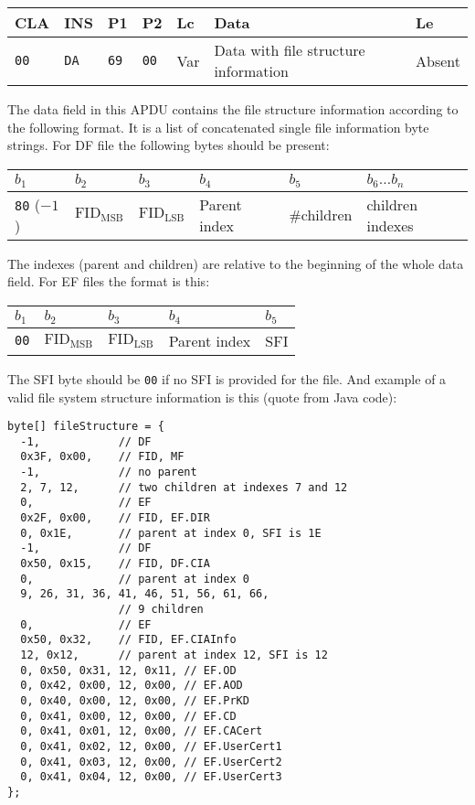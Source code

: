 \documentclass{article}
\begin{document}
\begin{flushleft}
\begin{tabular}{|l|l|l|l|l|l|l|}
\hline
CLA & INS & P1 & P2 & Lc & Data & Le \\
\hline
\texttt{00} & \texttt{DA} & \texttt{69} & \texttt{00} &
Var & Data with file structure information & Absent \\
\hline
\end{tabular}
\end{flushleft}
The data field in this APDU contains the file structure information
according to the following format. It is a list of concatenated single
file information byte strings.  For DF file the following bytes should
be present:
\begin{flushleft}
\begin{tabular}{|l|l|l|l|l|l|}
\hline
$b_1$ & $b_2$ & $b_3$ & $b_4$ & $b_5$ & $b_6\dots b_n$ \\
\hline
\texttt{80} ($-1$) & $\mathrm{FID}_{\mathrm{MSB}}$ & $\mathrm{FID}_{\mathrm{LSB}}$ & 
Parent index & \#children & children indexes\\
\hline
\end{tabular}
\end{flushleft}
The indexes (parent and children) are relative to the beginning of the
whole data field. For EF files the format is this:
\begin{flushleft}
\begin{tabular}{|l|l|l|l|l|}
\hline
$b_1$ & $b_2$ & $b_3$ & $b_4$ & $b_5$  \\
\hline
\texttt{00} & $\mathrm{FID}_{\mathrm{MSB}}$ & $\mathrm{FID}_{\mathrm{LSB}}$ & 
Parent index & SFI \\
\hline
\end{tabular}
\end{flushleft}
The SFI byte should be \texttt{00} if no SFI is provided for the file.
And example of a valid file system structure information is this
(quote from Java code):
\begin{verbatim}
byte[] fileStructure = {
  -1,            // DF
  0x3F, 0x00,    // FID, MF
  -1,            // no parent
  2, 7, 12,      // two children at indexes 7 and 12
  0,             // EF
  0x2F, 0x00,    // FID, EF.DIR
  0, 0x1E,       // parent at index 0, SFI is 1E
  -1,            // DF
  0x50, 0x15,    // FID, DF.CIA
  0,             // parent at index 0
  9, 26, 31, 36, 41, 46, 51, 56, 61, 66,
                 // 9 children
  0,             // EF
  0x50, 0x32,    // FID, EF.CIAInfo
  12, 0x12,      // parent at index 12, SFI is 12
  0, 0x50, 0x31, 12, 0x11, // EF.OD
  0, 0x42, 0x00, 12, 0x00, // EF.AOD
  0, 0x40, 0x00, 12, 0x00, // EF.PrKD
  0, 0x41, 0x00, 12, 0x00, // EF.CD
  0, 0x41, 0x01, 12, 0x00, // EF.CACert
  0, 0x41, 0x02, 12, 0x00, // EF.UserCert1
  0, 0x41, 0x03, 12, 0x00, // EF.UserCert2
  0, 0x41, 0x04, 12, 0x00, // EF.UserCert3
};
\end{verbatim}
\end{document}
